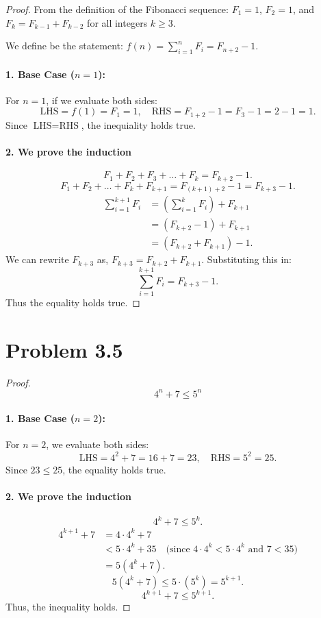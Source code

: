 \documentclass[12pt]{article}
\begin{document}
\begin{proof}
From the definition of the Fibonacci sequence: $F_1 = 1$, $F_2 = 1$, and $F_k = F_{k-1} + F_{k-2}$ for all integers $k \ge 3$. 

We define be the statement: $\displaystyle f(n) = \sum_{i=1}^{n} F_i = F_{n+2} - 1$.

\paragraph{1. Base Case ($n = 1$):}
For $n = 1$, if we evaluate both sides:
\[
\text{LHS} = f(1) = F_1 = 1, \quad \text{RHS} = F_{1+2} - 1 = F_3 - 1 = 2 - 1 = 1.
\]
Since $\text{LHS} = \text{RHS}$, the inequiality holds true.

\paragraph{2. We prove the induction}
\[
F_1 + F_2 + F_3 + \dots + F_k = F_{k+2} - 1.
\]
\[
F_1 + F_2 + \dots + F_k + F_{k+1} = F_{(k+1)+2} - 1 = F_{k+3} - 1.
\]
\begin{align*}
\sum_{i=1}^{k+1} F_i &= \left( \sum_{i=1}^{k} F_i \right) + F_{k+1} \\
&= (F_{k+2} - 1) + F_{k+1}  \\
&= (F_{k+2} + F_{k+1}) - 1.
\end{align*}
We can rewrite $F_{k+3}$ as, $F_{k+3} = F_{k+2} + F_{k+1}$. Substituting this in:
\[
\sum_{i=1}^{k+1} F_i = F_{k+3} - 1.
\]
Thus the equality holds true.
\end{proof}
\newpage
\section*{Problem 3.5}
\begin{proof}
\[4^n+7\le 5^n\]
\paragraph{1. Base Case ($n = 2$):}
For $n = 2$, we evaluate both sides:
\[
\text{LHS} = 4^2 + 7 = 16 + 7 = 23, \quad \text{RHS} = 5^2 = 25.
\]
Since $23 \le 25$, the equality holds true.

\paragraph{2. We prove the induction}
\[
4^k + 7 \le 5^k.
\]
\begin{align*}
4^{k+1} + 7 &= 4 \cdot 4^k + 7 \\
&< 5 \cdot 4^k + 35 \quad \text{(since } 4 \cdot 4^k < 5 \cdot 4^k \text{ and } 7 < 35\text{)} \\
&= 5(4^k + 7).
\end{align*}
\[
5(4^k + 7) \le 5 \cdot (5^k) = 5^{k+1}.
\]
\[
4^{k+1} + 7 \le 5^{k+1}.
\]
Thus, the inequality holds.
\end{proof}
\end{document}
